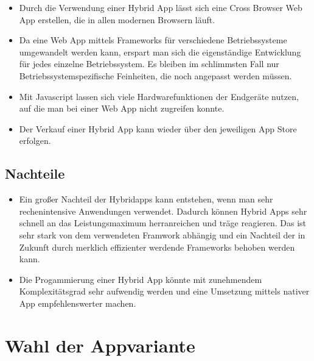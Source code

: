 \begin{itemize}

	\item Durch die Verwendung einer Hybrid App lässt sich eine Cross Browser Web App erstellen, die in allen modernen Browsern läuft.\cite[]{WEB:APPEV:2014}

	\item Da eine Web App mittels Frameworks für verschiedene Betriebssysteme umgewandelt werden kann, erspart man sich die eigenständige Entwicklung für jedes einzelne Betriebssystem. Es bleiben im schlimmsten Fall nur Betriebssystemspezifische Feinheiten, die noch angepasst werden müssen.\cite[]{WEB:APPEV:2014}

	\item Mit Javascript lassen sich viele Hardwarefunktionen der Endgeräte nutzen, auf die man bei einer Web App nicht zugreifen konnte.\cite[]{WEB:APPEV:2014}

	\item Der Verkauf einer Hybrid App kann wieder über den jeweiligen App Store erfolgen.\cite[]{WEB:APPEV:2014}

\end{itemize}

\subsection{Nachteile}
\label{sec:hybrid:cons}

\begin{itemize}

	\item Ein großer Nachteil der Hybridapps kann entstehen, wenn man sehr rechenintensive Anwendungen verwendet. Dadurch können Hybrid Apps sehr schnell an das Leistungsmaximum herranreichen und träge reagieren. Das ist sehr stark von dem verwendeten Framwork abhängig und ein Nachteil der in Zukunft durch merklich effizienter werdende Frameworks behoben werden kann.\cite[]{WEB:APPEV:2014}

	\item Die Progammierung einer Hybrid App könnte mit zunehmendem Komplexitätsgrad sehr aufwendig werden und eine Umsetzung mittels nativer App empfehlenswerter machen.\cite[]{WEB:APPEV:2014}

\end{itemize}

\section{Wahl der Appvariante}
\label{sec:intro:Appvariante}
